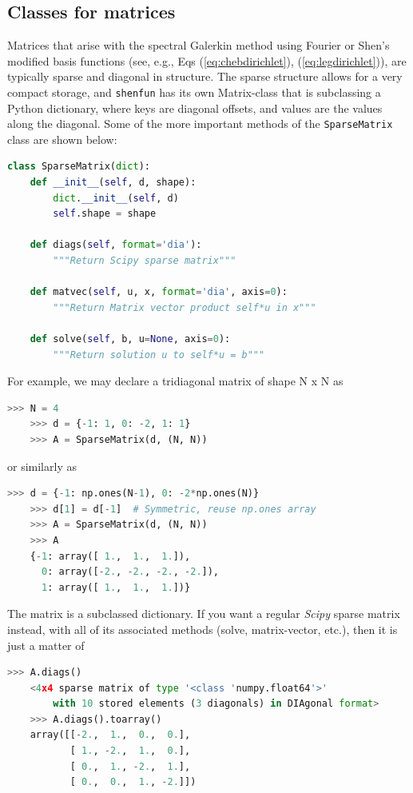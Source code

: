 \documentclass[%
oneside,                 %
final,                   %
10pt]{article}
\begin{document}
\subsection{Classes for matrices}
\label{sec:matrices}
Matrices that arise with the spectral Galerkin method using Fourier or Shen's modified basis functions (see, e.g., Eqs (\ref{eq:chebdirichlet}), (\ref{eq:legdirichlet})), are typically sparse and diagonal in structure. The sparse structure allows for a very compact storage, and \texttt{shenfun} has its own Matrix-class that is subclassing a Python dictionary, where keys are diagonal offsets, and values are the values along the diagonal. Some of the more important methods of the \texttt{SparseMatrix} class are shown below:

\begin{lstlisting}[language=Python,style=yellow2_fb]
class SparseMatrix(dict):
    def __init__(self, d, shape):
        dict.__init__(self, d)
        self.shape = shape
        
    def diags(self, format='dia'):
        """Return Scipy sparse matrix"""

    def matvec(self, u, x, format='dia', axis=0):
        """Return Matrix vector product self*u in x"""
        
    def solve(self, b, u=None, axis=0):
        """Return solution u to self*u = b"""
\end{lstlisting}

For example, we may declare a tridiagonal matrix of shape N x N as
\begin{lstlisting}[language=Python,style=yellow2_fb]
    >>> N = 4
    >>> d = {-1: 1, 0: -2, 1: 1}
    >>> A = SparseMatrix(d, (N, N))
\end{lstlisting}
or similarly as
\begin{lstlisting}[language=Python,style=yellow2_fb]
    >>> d = {-1: np.ones(N-1), 0: -2*np.ones(N)}
    >>> d[1] = d[-1]  # Symmetric, reuse np.ones array
    >>> A = SparseMatrix(d, (N, N))
    >>> A
    {-1: array([ 1.,  1.,  1.]),
      0: array([-2., -2., -2., -2.]),
      1: array([ 1.,  1.,  1.])}
\end{lstlisting}
The matrix is a subclassed dictionary. If you want a regular \emph{Scipy} sparse matrix instead, with all of its associated methods (solve, matrix-vector, etc.), then it is just a matter of
\begin{lstlisting}[language=Python,style=yellow2_fb]
    >>> A.diags()
    <4x4 sparse matrix of type '<class 'numpy.float64'>'
        with 10 stored elements (3 diagonals) in DIAgonal format>
    >>> A.diags().toarray()
    array([[-2.,  1.,  0.,  0.],
           [ 1., -2.,  1.,  0.],
           [ 0.,  1., -2.,  1.],
           [ 0.,  0.,  1., -2.]])
\end{lstlisting}
\end{document}
